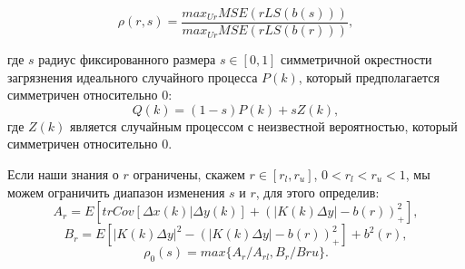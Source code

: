 \begin{equation}
\rho(r,s)=\frac{max_{Ur}MSE(rLS(b(s)))}{max_{Ur}MSE(rLS(b(r)))},
\end{equation}

\noindent где $s$ радиус фиксированного размера $s\in[0,1]$ симметричной окрестности загрязнения идеального случайного процесса $P(k)$, который предполагается симметричен относительно $0$:
\begin{equation}
Q(k)=(1-s)P(k)+sZ(k),
\end{equation}
\noindent где $Z(k)$ является случайным процессом с неизвестной вероятностью, который симметричен относительно $0$.

Если наши знания о $r$ ограничены, скажем $r\in[r_l,r_u]$, $0<r_l<r_u<1$, мы можем ограничить диапазон изменения $s$ и $r$, для этого определив:
\begin{equation}
A_r=E\left[trCov[\Delta x(k)|\Delta y(k)]+(|K(k)\Delta y|-b(r))_+^2\right],
\end{equation}
\begin{equation}
B_r=E\left[|K(k)\Delta y|^2-(|K(k)\Delta y|-b(r))^2_+\right]+b^2(r),
\end{equation}
\begin{equation}
\rho_0(s)=max\{A_r/A_{rl},B_r/B{ru}\}.
\end{equation}

